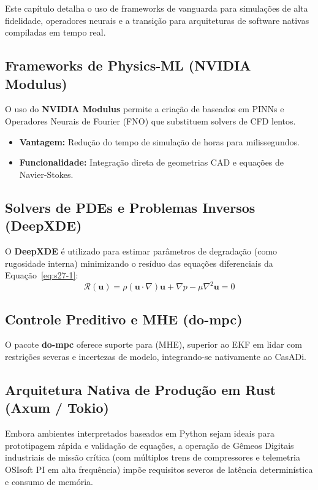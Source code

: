 \documentclass[12pt,a4paper]{article}
\numberwithin{equation}{section}
\numberwithin{table}{section}
\numberwithin{figure}{section}
\begin{document}
	Este capítulo detalha o uso de frameworks de vanguarda para simulações de alta fidelidade, operadores neurais e a transição para arquiteturas de software nativas compiladas em tempo real.
	
	\subsection{Frameworks de Physics-ML (NVIDIA Modulus)}
	O uso do \textbf{NVIDIA Modulus} \cite{modulus} permite a criação de  baseados em PINNs e Operadores Neurais de Fourier (FNO) que substituem solvers de CFD lentos.
	\begin{itemize}
		\item \textbf{Vantagem:} Redução do tempo de simulação de horas para milissegundos.
		\item \textbf{Funcionalidade:} Integração direta de geometrias CAD e equações de Navier-Stokes.
	\end{itemize}
	
	\subsection{Solvers de PDEs e Problemas Inversos (DeepXDE)}
	O \textbf{DeepXDE} \cite{deepxde} é utilizado para estimar parâmetros de degradação (como rugosidade interna) minimizando o resíduo das equações diferenciais da Equação~\eqref{eq:s27-1}:
	\begin{equation}\label{eq:s27-1}
 \mathcal{R}(\mathbf{u}) = \rho (\mathbf{u} \cdotp \nabla) \mathbf{u} + \nabla p - \mu \nabla^2 \mathbf{u} = 0 
\end{equation}
	
	\subsection{Controle Preditivo e MHE (do-mpc)}
	O pacote \textbf{do-mpc} \cite{dompc} oferece suporte para  (MHE), superior ao EKF em lidar com restrições severas e incertezas de modelo, integrando-se nativamente ao CasADi.
	
	\subsection{Arquitetura Nativa de Produção em Rust (Axum / Tokio)}
	Embora ambientes interpretados baseados em Python sejam ideais para prototipagem rápida e validação de equações, a operação de Gêmeos Digitais industriais de missão crítica (com múltiplos trens de compressores e telemetria OSIsoft PI em alta frequência) impõe requisitos severos de latência determinística e consumo de memória.
	
\end{document}
